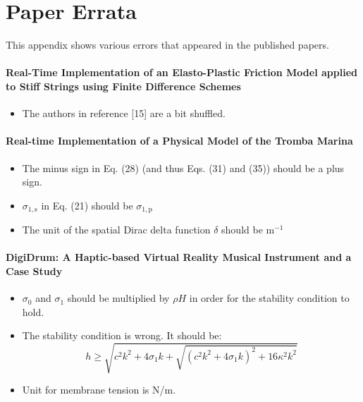 \chapter{Paper Errata}\label{app:paperErrata}
This appendix shows various errors that appeared in the published papers.
\\
\subsubsection{Real-Time Implementation of an Elasto-Plastic Friction Model applied to Stiff Strings using Finite Difference Schemes \citeP[C]}
\begin{itemize}
    \item The authors in reference [15] are a bit shuffled.
\end{itemize}
\subsubsection{Real-time Implementation of a Physical Model of the Tromba Marina \citeP[D]}
\begin{itemize}
    \item The minus sign in Eq. (28) (and thus Eqs. (31) and (35)) should be a plus sign.
    \item $\sigma_{1,\text{s}}$ in Eq. (21) should be $\sigma_{1,\text{p}}$
    \item The unit of the spatial Dirac delta function $\delta$ should be m$^{-1}$
\end{itemize}
%
\subsubsection{DigiDrum: A Haptic-based Virtual Reality Musical Instrument and a Case Study \citeP[F]}
\begin{itemize}
    \item $\sigma_0$ and $\sigma_1$ should be multiplied by $\rho H$ in order for the stability condition to hold.
    \item The stability condition is wrong. It should be: 
    \begin{equation}
        h \geq \sqrt{c^2k^2 + 4\sigma_1k + \sqrt{(c^2k^2+4\sigma_1k)^2 + 16\kappa^2k^2}}
    \end{equation}
    \item Unit for membrane tension is N/m.
\end{itemize}
